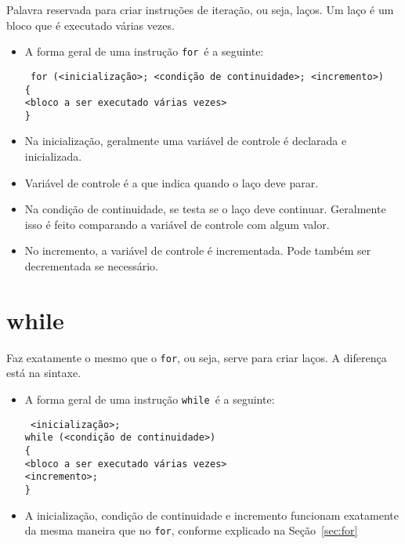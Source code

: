 \documentclass{book}
\newcommand{\TAB}{{\hspace*{1cm}}}
\newcommand{\FOR}{{\tt for}}
\newcommand{\WHILE}{{\tt while}}
\begin{document}
Palavra reservada para criar instruções de iteração, ou seja, laços. Um laço é um bloco que é executado várias vezes.

\begin{itemize}

\item A forma geral de uma instrução \FOR\ é a seguinte:

{\tt 
for (<inicialização>; <condição de continuidade>; <incremento>) \\
\{                                                            \\
\TAB <bloco a ser executado várias vezes>                     \\
\}                                                            \\
}

\item Na inicialização, geralmente uma variável de controle é declarada e inicializada.
\item Variável de controle é a que indica quando o laço deve parar.
\item Na condição de continuidade, se testa se o laço deve continuar. Geralmente isso é feito comparando a variável de controle com algum valor.
\item No incremento, a variável de controle é incrementada. Pode também ser decrementada se necessário.

\end{itemize}


\section{while}
\label{sec:while}

Faz exatamente o mesmo que o \FOR, ou seja, serve para criar laços. A diferença está na sintaxe.

\begin{itemize}

\item A forma geral de uma instrução \WHILE\ é a seguinte:

{\tt 
<inicialização>;                                              \\ 
while (<condição de continuidade>)                            \\
\{                                                            \\
\TAB <bloco a ser executado várias vezes>                     \\
\TAB <incremento>;                                            \\
\}                                                            \\
}

\item A inicialização, condição de continuidade e incremento funcionam exatamente da mesma maneira que no \FOR, conforme explicado na Seção~\ref{sec:for}

\end{itemize}
\end{document}
